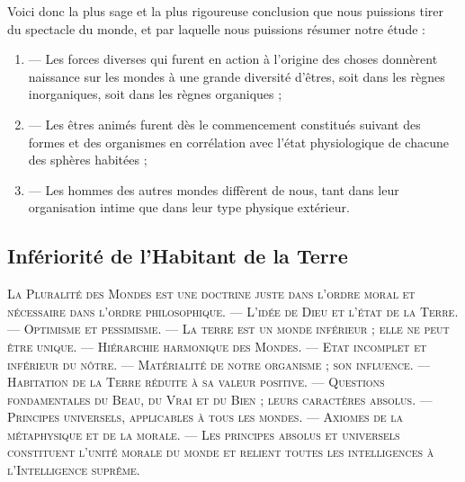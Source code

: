 \documentclass[a4paper, 11pt, oneside]{article}
\begin{document}
Voici donc la plus sage et la plus rigoureuse conclusion que nous puissions tirer du spectacle du monde, et par laquelle nous puissions résumer notre étude :
\begin{enumerate}
    \item --- Les forces diverses qui furent en action à l'origine des choses donnèrent naissance sur les mondes à une grande diversité d'êtres, soit dans les règnes inorganiques, soit dans les règnes organiques ;

    \item --- Les êtres animés furent dès le commencement constitués suivant des formes et des organismes en corrélation avec l'état physiologique de chacune des sphères habitées ;

    \item --- Les hommes des autres mondes diffèrent de nous, tant dans leur organisation intime que dans leur type physique extérieur.
\end{enumerate}
\clearpage
\subsection{Infériorité de l'Habitant de la Terre}
\begin{center}
\scshape
\small
La Pluralité des Mondes est une doctrine juste dans l'ordre moral et nécessaire dans l'ordre philosophique. --- L'idée de Dieu et l'état de la Terre. --- Optimisme et pessimisme. --- La terre est un monde inférieur ; elle ne peut être unique. --- Hiérarchie harmonique des Mondes. --- Etat incomplet et inférieur du nôtre. --- Matérialité de notre organisme ; son influence. --- Habitation de la Terre réduite à sa valeur positive. --- Questions fondamentales du Beau, du Vrai et du Bien ; leurs caractères absolus. --- Principes universels, applicables à tous les mondes. --- Axiomes de la métaphysique et de la morale. --- Les principes absolus et universels constituent l'unité morale du monde et relient toutes les intelligences à l'Intelligence suprême.
\end{center}
\end{document}
